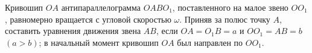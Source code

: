 Кривошип $OA$ антипараллелограмма $OABO_1$,
поставленного на малое звено $OO_1$,
равномерно вращается с угловой скоростью $\omega$.
Приняв за полюс точку $A$, составить уравнения движения звена $AB$,
если $OA = O_1 B = a$ и $OO_1 = AB = b$ $(a > b)$;
в начальный момент кривошип $OA$ был направлен по $OO_1$.
